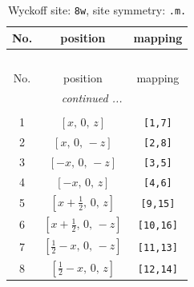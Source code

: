 \documentclass[fleqn,8pt]{jsarticle}
\begin{document}
\begin{longtable}{ccc}
\caption{Wyckoff site: {\tt 8w}, site symmetry: {\tt .m.}}
 \\
 \hline \hline
No. & position & mapping \\ \hline \endfirsthead

\multicolumn{2}{l}{\tablename\ \thetable{}} \\
 \hline \hline
No. & position & mapping \\ \hline \endhead

 \hline \hline
\multicolumn{2}{r}{\footnotesize\it continued ...} \\ \endfoot

 \hline \hline
\multicolumn{2}{r}{} \\ \endlastfoot

1 & $\left[ x,\, 0,\, z \right]$ & {\tt [1,7]} \\ \hline
2 & $\left[ x,\, 0,\, - z \right]$ & {\tt [2,8]} \\ \hline
3 & $\left[ - x,\, 0,\, - z \right]$ & {\tt [3,5]} \\ \hline
4 & $\left[ - x,\, 0,\, z \right]$ & {\tt [4,6]} \\ \hline
5 & $\left[ x + \frac{1}{2},\, 0,\, z \right]$ & {\tt [9,15]} \\ \hline
6 & $\left[ x + \frac{1}{2},\, 0,\, - z \right]$ & {\tt [10,16]} \\ \hline
7 & $\left[ \frac{1}{2} - x,\, 0,\, - z \right]$ & {\tt [11,13]} \\ \hline
8 & $\left[ \frac{1}{2} - x,\, 0,\, z \right]$ & {\tt [12,14]} \\
\end{longtable}
\renewcommand{\arraystretch}{1.2}
\end{document}
